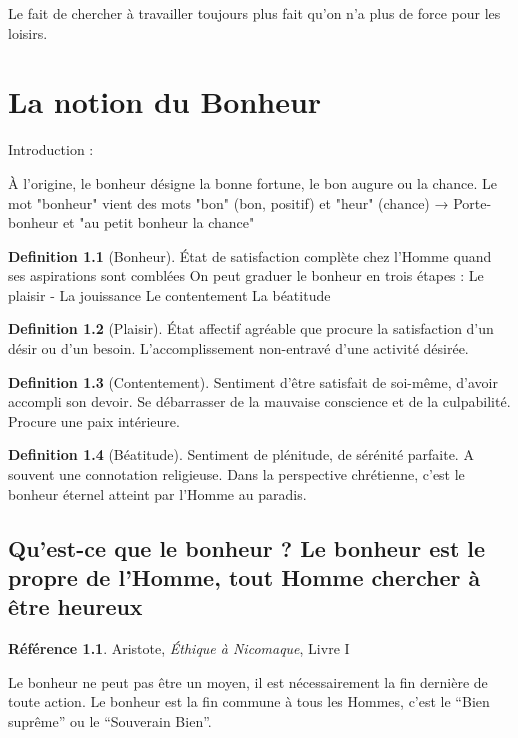 \documentclass[french]{book}
\theoremstyle{definition}
\newtheorem*{dfn}{Definition}
\newtheorem*{refe}{Référence}
\begin{document}
Le fait de chercher à travailler toujours plus fait qu'on n’a plus de force pour les loisirs.

\chapter{La notion du Bonheur}

Introduction :

À l'origine, le bonheur désigne la bonne fortune, le bon augure ou la chance.
Le mot "bonheur" vient des mots "bon" (bon, positif) et "heur" (chance) → Porte-bonheur et "au petit bonheur la chance"



\begin{dfn}[Bonheur]
	État de satisfaction complète chez l'Homme quand ses aspirations sont comblées
On peut graduer le bonheur en trois étapes :
Le plaisir - La jouissance
Le contentement
La béatitude
\end{dfn}



\begin{dfn}[Plaisir]
	État affectif agréable que procure la satisfaction d'un désir ou d'un besoin. L'accomplissement non-entravé d'une activité désirée.
\end{dfn}


\begin{dfn}[Contentement]
	Sentiment d'être satisfait de soi-même, d'avoir accompli son devoir. Se débarrasser de la mauvaise conscience et de la culpabilité. Procure une paix intérieure.
\end{dfn}


\begin{dfn}[Béatitude]
	Sentiment de plénitude, de sérénité parfaite. A souvent une connotation religieuse. Dans la perspective chrétienne, c’est le bonheur éternel atteint par l’Homme au paradis.
\end{dfn}


\section{Qu’est-ce que le bonheur ? Le bonheur est le propre de l’Homme, tout Homme chercher à être heureux}

\begin{refe}
	Aristote, \textit{Éthique à Nicomaque}, Livre I
\end{refe}

Le bonheur ne peut pas être un moyen, il est nécessairement la fin dernière de toute action. Le bonheur est la fin commune à tous les Hommes, c'est le “Bien suprême” ou le “Souverain Bien”.
\end{document}
